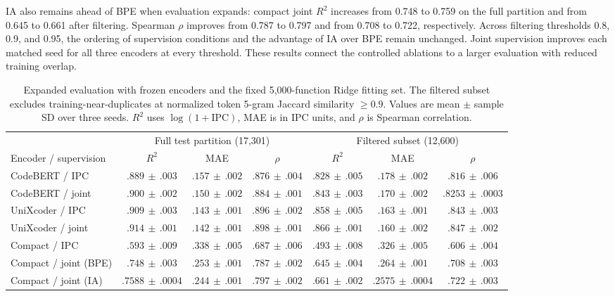 \documentclass[conference]{IEEEtran}
\newcommand{\Rsq}{R^{2}}
\begin{document}
IA also remains ahead of BPE when evaluation expands: compact joint $\Rsq$ increases from 0.748 to 0.759 on the full partition and from 0.645 to 0.661 after filtering. Spearman $\rho$ improves from 0.787 to 0.797 and from 0.708 to 0.722, respectively. Across filtering thresholds 0.8, 0.9, and 0.95, the ordering of supervision conditions and the advantage of IA over BPE remain unchanged. Joint supervision improves each matched seed for all three encoders at every threshold. These results connect the controlled ablations to a larger evaluation with reduced training overlap.

\begin{table}[t]
\caption{Expanded evaluation with frozen encoders and the fixed 5,000-function Ridge fitting set. The filtered subset excludes training-near-duplicates at normalized token 5-gram Jaccard similarity $\geq0.9$. Values are mean $\pm$ sample SD over three seeds. $\Rsq$ uses $\log(1+\mathrm{IPC})$, MAE is in IPC units, and $\rho$ is Spearman correlation.}
\label{tab:expanded}
\centering\small
\setlength{\tabcolsep}{4pt}
\begin{tabular}{lcccccc}
\toprule
 & \multicolumn{3}{c}{Full test partition (17,301)} & \multicolumn{3}{c}{Filtered subset (12,600)}\\
\cmidrule(lr){2-4}\cmidrule(lr){5-7}
Encoder / supervision & $\Rsq$ & MAE & $\rho$ & $\Rsq$ & MAE & $\rho$\\
\midrule
CodeBERT / IPC & $.889\,\pm\,.003$ & $.157\,\pm\,.002$ & $.876\,\pm\,.004$ & $.828\,\pm\,.005$ & $.178\,\pm\,.002$ & $.816\,\pm\,.006$\\
CodeBERT / joint & $.900\,\pm\,.002$ & $.150\,\pm\,.002$ & $.884\,\pm\,.001$ & $.843\,\pm\,.003$ & $.170\,\pm\,.002$ & $.8253\,\pm\,.0003$\\
\midrule
UniXcoder / IPC & $.909\,\pm\,.003$ & $.143\,\pm\,.001$ & $.896\,\pm\,.002$ & $.858\,\pm\,.005$ & $.163\,\pm\,.001$ & $.843\,\pm\,.003$\\
UniXcoder / joint & $.914\,\pm\,.001$ & $.142\,\pm\,.001$ & $.898\,\pm\,.001$ & $.866\,\pm\,.001$ & $.160\,\pm\,.002$ & $.847\,\pm\,.002$\\
\midrule
Compact / IPC & $.593\,\pm\,.009$ & $.338\,\pm\,.005$ & $.687\,\pm\,.006$ & $.493\,\pm\,.008$ & $.326\,\pm\,.005$ & $.606\,\pm\,.004$\\
Compact / joint (BPE) & $.748\,\pm\,.003$ & $.253\,\pm\,.001$ & $.787\,\pm\,.002$ & $.645\,\pm\,.004$ & $.264\,\pm\,.001$ & $.708\,\pm\,.003$\\
Compact / joint (IA) & $.7588\,\pm\,.0004$ & $.244\,\pm\,.001$ & $.797\,\pm\,.002$ & $.661\,\pm\,.002$ & $.2575\,\pm\,.0004$ & $.722\,\pm\,.003$\\
\bottomrule
\end{tabular}
\end{table}
\end{document}
